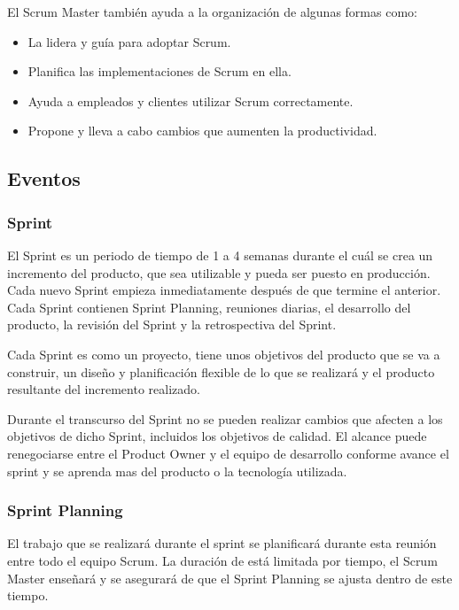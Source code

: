 El Scrum Master también ayuda a la organización de algunas formas como:
\begin{itemize}
	\item La lidera y guía para adoptar Scrum.
	\item Planifica las implementaciones de Scrum en ella.
	\item Ayuda a empleados y clientes utilizar Scrum correctamente.
	\item Propone y lleva a cabo cambios que aumenten la productividad.
\end{itemize}

\subsection{Eventos}

\subsubsection{Sprint}

El Sprint es un periodo de tiempo de 1 a 4 semanas durante el cuál se crea un incremento del 
producto, que sea utilizable y pueda ser puesto en producción. Cada nuevo Sprint empieza 
inmediatamente después de que termine el anterior. Cada Sprint contienen Sprint Planning, 
reuniones diarias, el desarrollo del producto, la revisión del Sprint y la retrospectiva del 
Sprint.

Cada Sprint es como un proyecto, tiene unos objetivos del producto que se va a construir, un 
diseño y planificación flexible de lo que se realizará y el producto resultante del incremento 
realizado.

Durante el transcurso del Sprint no se pueden realizar cambios que afecten a los objetivos de 
dicho Sprint, incluidos los objetivos de calidad. El alcance puede renegociarse  entre el Product 
Owner y el equipo de desarrollo conforme avance  el sprint y se aprenda mas del producto o la 
tecnología utilizada.

\subsubsection{Sprint Planning}

El trabajo que se realizará durante el sprint se planificará durante esta reunión entre 
todo el equipo Scrum. La duración de está limitada por tiempo, el Scrum Master 
enseñará y se asegurará de que el Sprint Planning se ajusta dentro de este tiempo.

